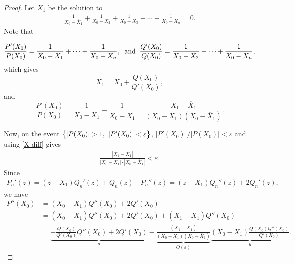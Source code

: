 \documentclass[9pt,a4paper,reqno]{amsart}
\theoremstyle{mine}
\theoremstyle{definition}
\theoremstyle{remark}
\renewcommand\epsilon{\varepsilon}
\begin{document}
\begin{proof}
    Let $\overline X_1$ be the solution to  
\begin{align*}
    \frac{1}{X_0-\overline{X}_1}+ \frac{1}{X_0 - X_2} + \frac{1}{X_0 - X_3}+ \cdots + \frac{1}{X_0-X_n}=0.
\end{align*}
Note that 

\begin{align}\label{aa2}
   \frac{P'(X_0)}{P(X_0)} = \frac{1}{X_0-X_1}+ \cdots + \frac{1}{X_0-X_n}, \hspace{2mm} \textrm{and} \hspace{2mm}  \frac{Q'(X_0)}{Q(X_0)} = \frac{1}{X_0-X_2}+ \cdots + \frac{1}{X_0-X_n},
\end{align}
which gives \[\overline{X}_1 = X_0 + \frac{Q(X_0)}{Q'(X_0)},\]
and 
\begin{equation}\label{X-diff}
    \frac{P'(X_0)}{P(X_0)} = \frac{1}{X_0 - X_1} - \frac{1}{X_0 - \overline X_1} = \frac{X_1 - \overline X_1}{(X_0 - X_1)(X_0 - \overline X_1)}.
\end{equation} 

\vspace{2mm}
Now, on the event $\big\{|P(X_0)| > 1 ,\hspace{.05in} |P'(X_0)|<\epsilon \big \}$, $|P'(X_0)|/|P(X_0)| < \epsilon$ and using \eqref{X-diff} gives  
\begin{align*}
   \frac{|X_1- \overline X_1|}{|X_0-X_1| \cdot |X_0- \overline X_1|} < \epsilon.
\end{align*}
Since 
\begin{align}\label{PQrelations}
    P_n'(z) = (z-X_1)Q_n'(z)+Q_n(z) \quad P_n''(z) = (z-X_1)Q_n''(z)+2Q_n'(z),
\end{align}
we have 
\begin{align}\label{aa3}
    P''(X_0) &= (X_0-X_1)Q''(X_0)+2Q'(X_0) \nonumber  \\[.75em]
    &= (X_0-\overline X_1)Q''(X_0)+2Q'(X_0) +(\overline X_1-X_1)Q''(X_0)  \nonumber \\[1em]
    & =  \underbrace{- \frac{Q(X_0)}{Q'(X_0)} Q''(X_0)+ 2Q'(X_0)}_{a} - \underbrace{\frac{(\overline X_1-X_1)}{(X_0-X_1)(X_0-\overline X_1)}}_{O(\epsilon)} \underbrace{(X_0-X_1) \frac{Q(X_0)Q''(X_0)}{Q'(X_0)}}_{b}.
\end{align}

 


\end{proof}
\end{document}
